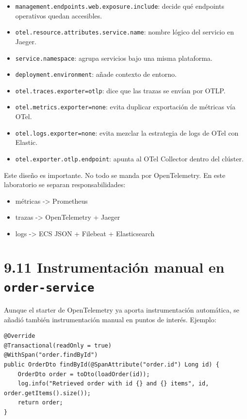 \documentclass[
a4paper,
12pt]{report}
\providecommand{\tightlist}{%
  \setlength{\itemsep}{0pt}\setlength{\parskip}{0pt}}
\newcounter{none}
\begin{document}
\begin{itemize}
\tightlist
\item
  \texttt{management.endpoints.web.exposure.include}: decide qué
  endpoints operativos quedan accesibles.
\item
  \texttt{otel.resource.attributes.service.name}: nombre lógico del
  servicio en Jaeger.
\item
  \texttt{service.namespace}: agrupa servicios bajo una misma
  plataforma.
\item
  \texttt{deployment.environment}: añade contexto de entorno.
\item
  \texttt{otel.traces.exporter=otlp}: dice que las trazas se envían por
  OTLP.
\item
  \texttt{otel.metrics.exporter=none}: evita duplicar exportación de
  métricas vía OTel.
\item
  \texttt{otel.logs.exporter=none}: evita mezclar la estrategia de logs
  de OTel con Elastic.
\item
  \texttt{otel.exporter.otlp.endpoint}: apunta al OTel Collector dentro
  del clúster.
\end{itemize}

Este diseño es importante. No todo se manda por OpenTelemetry. En este
laboratorio se separan responsabilidades:

\begin{itemize}
\tightlist
\item
  métricas -\textgreater{} Prometheus
\item
  trazas -\textgreater{} OpenTelemetry + Jaeger
\item
  logs -\textgreater{} ECS JSON + Filebeat + Elasticsearch
\end{itemize}

\section{\texorpdfstring{9.11 Instrumentación manual en
\texttt{order-service}}{9.11 Instrumentación manual en order-service}}\label{instrumentaciuxf3n-manual-en-order-service}

Aunque el starter de OpenTelemetry ya aporta instrumentación automática,
se añadió también instrumentación manual en puntos de interés. Ejemplo:

\begin{verbatim}
@Override
@Transactional(readOnly = true)
@WithSpan("order.findById")
public OrderDto findById(@SpanAttribute("order.id") Long id) {
    OrderDto order = toDto(loadOrder(id));
    log.info("Retrieved order with id {} and {} items", id, order.getItems().size());
    return order;
}
\end{verbatim}
\end{document}
